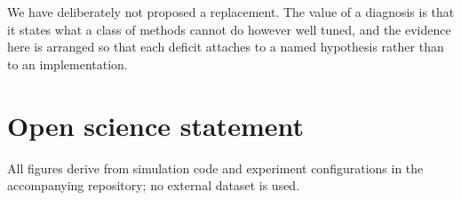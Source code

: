 We have deliberately not proposed a replacement. The value of a diagnosis is
that it states what a class of methods cannot do however well tuned, and the
evidence here is arranged so that each deficit attaches to a named hypothesis
rather than to an implementation.


\section*{Open science statement}
All figures derive from simulation code and experiment configurations in the
accompanying repository; no external dataset is used. 
